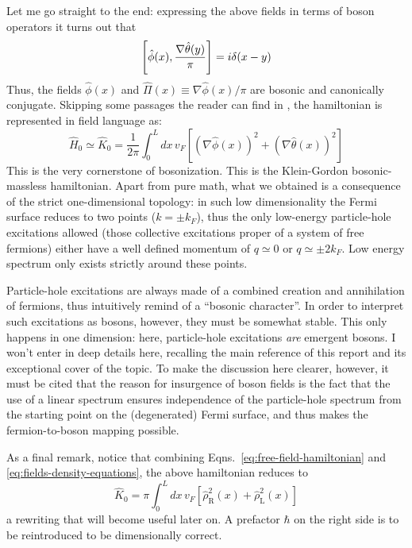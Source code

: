 Let me go straight to the end: expressing the above fields in terms of boson operators it turns out that
\[
	\comm{\hat \phi(x)}{\frac{\nabla \hat \theta(y)}{\pi}} = i \delta(x-y)
\]
Thus, the fields $\hat \phi(x)$ and $\hat \Pi(x) \equiv \nabla \hat \phi(x)/\pi$ are bosonic and canonically conjugate.
Skipping some passages the reader can find in \cite[Chap.~2]{giamarchi2003quantum}, the hamiltonian is represented in field language as:
\begin{equation}\label{eq:free-field-hamiltonian}
	\hat H_0 \simeq \hat K_0 = \frac{1}{2\pi} \int_0^L dx \, v_F \left[ \left( \nabla \hat \phi(x) \right)^2 + \left( \nabla \hat \theta(x) \right)^2 \right]
\end{equation}
This is the very cornerstone of bosonization. This is the Klein-Gordon bosonic-massless hamiltonian. Apart from pure math, what we obtained is a consequence of the strict one-dimensional topology: in such low dimensionality the Fermi surface reduces to two points ($k=\pm k_F$), thus the only low-energy particle-hole excitations allowed (those collective excitations proper of a system of free fermions) either have a well defined momentum of $q \simeq 0$ or $q \simeq \pm 2k_F$. Low energy spectrum only exists strictly around these points.

Particle-hole excitations are always made of a combined creation and annihilation of fermions, thus intuitively remind of a ``bosonic character''. In order to interpret such excitations as bosons, however, they must be somewhat stable. This only happens in one dimension: here, particle-hole excitations \textit{are} emergent bosons. I won't enter in deep details here, recalling the main reference of this report \cite{giamarchi2003quantum} and its exceptional cover of the topic. To make the discussion here clearer, however, it must be cited that the reason for insurgence of boson fields is the fact that the use of a linear spectrum ensures independence of the particle-hole spectrum from the starting point on the (degenerated) Fermi surface, and thus makes the fermion-to-boson mapping possible.

As a final remark, notice that combining Eqns.~\eqref{eq:free-field-hamiltonian} and \eqref{eq:fields-density-equations}, the above hamiltonian reduces to
\begin{equation}\label{eq:free-field-hamiltonian-density-integral}
	\hat K_0 = \pi \int_0^L dx \, v_F \left[  
		\hat \rho_\mathrm{R}^2 (x) + \hat \rho_\mathrm{L}^2 (x)
	\right]
\end{equation}
a rewriting that will become useful later on. A prefactor $\hbar$ on the right side is to be reintroduced to be dimensionally correct.

